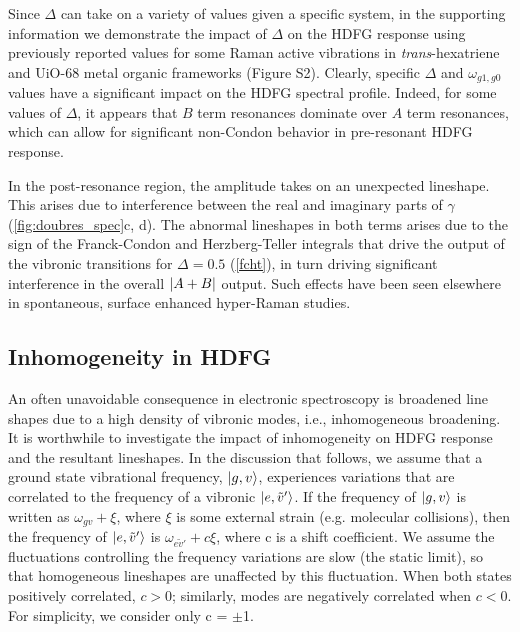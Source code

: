 \documentclass[aip, jcp, reprint, onecolumn, nofootinbib]{revtex4-2}
\begin{document}
Since $\Delta$ can take on a variety of values given a specific system, in the supporting information we demonstrate the impact of $\Delta$ on the HDFG response using previously reported values for some Raman active vibrations in \textit{trans}-hexatriene and UiO-68 metal organic frameworks (Figure S2). \cite{Myers1982, Brennan2024}
Clearly, specific $\Delta$ and $\omega_{g1, g0}$ values have a significant impact on the HDFG spectral profile.
Indeed, for some values of $\Delta$, it appears that $B$ term resonances dominate over $A$ term resonances, which can allow for significant non-Condon behavior in pre-resonant HDFG response.

In the post-resonance region, the amplitude takes on an unexpected lineshape.
This arises due to interference between the real and imaginary parts of $\gamma$ (\autoref{fig:doubres_spec}c, d).
The abnormal lineshapes in both terms arises due to the sign of the Franck-Condon and Herzberg-Teller integrals that drive the output of the vibronic transitions for $\Delta = 0.5$ (\autoref{fcht}), in turn driving significant interference in the overall $\abs{A+B}$ output.
Such effects have been seen elsewhere in spontaneous, surface enhanced hyper-Raman studies. \cite{Milojevich2011}


\subsection{Inhomogeneity in HDFG}

An often unavoidable consequence in electronic spectroscopy is broadened line shapes due to a high density of vibronic modes, i.e., inhomogeneous broadening.
It is worthwhile to investigate the impact of inhomogeneity on HDFG response and the resultant lineshapes. 
In the discussion that follows, we assume that a ground state vibrational frequency, $\ket{g,v}$, experiences variations that are correlated to the frequency of a vibronic $\ket{e,\tilde{v}'}$.
If the frequency of $\ket{g,v}$ is written as $\omega_{gv} + \xi$, where $\xi$ is some external strain (e.g. molecular collisions), then the frequency of $\ket{e,\tilde{v}'}$ is $\omega_{e\tilde{v}'} + c\xi$, where c is a shift coefficient.
We assume the fluctuations controlling the frequency variations are slow (the static limit), so that homogeneous lineshapes are unaffected by this fluctuation. 
When both states positively correlated, $c > 0$; similarly, modes are negatively correlated when $c < 0$.
For simplicity, we consider only c = $\pm$1.
\end{document}
